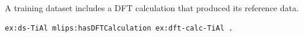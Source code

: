 A training dataset includes a DFT calculation that produced its reference data.
\begin{lstlisting}[language=turtle]
ex:ds-TiAl mlips:hasDFTCalculation ex:dft-calc-TiAl .
\end{lstlisting}
